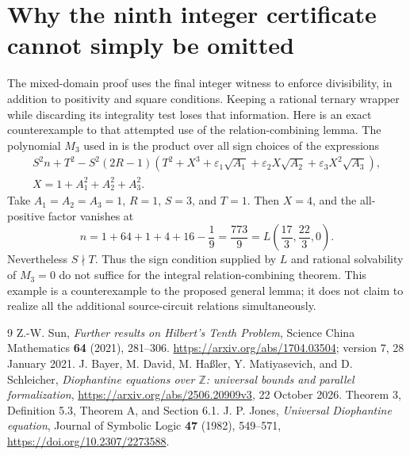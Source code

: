 \documentclass[11pt,a4paper]{article}
\begin{document}
\section{Why the ninth integer certificate cannot simply be omitted}
The mixed-domain proof uses the final integer witness to enforce divisibility,
in addition to positivity and square conditions. Keeping a rational ternary
wrapper while discarding its integrality test loses that information.
Here is an exact counterexample to that attempted use of the relation-combining
lemma. The polynomial $M_3$ used in \cite{Sun,BDHMS} is the product over all
sign choices of the expressions
\[
 \begin{gathered}
 S^2n+T^2-S^2(2R-1)
 \left(T^2+X^3+\varepsilon_1\sqrt{A_1}
       +\varepsilon_2X\sqrt{A_2}+\varepsilon_3X^2\sqrt{A_3}\right),
 \\
 X=1+A_1^2+A_2^2+A_3^2.
 \end{gathered}
\]
Take $A_1=A_2=A_3=1$, $R=1$, $S=3$, and $T=1$. Then $X=4$,
and the all-positive factor vanishes at
\[
 n=1+64+1+4+16-\frac19=\frac{773}{9}
   =L\left(\frac{17}{3},\frac{22}{3},0\right).
\]
Nevertheless $S\nmid T$. Thus the sign condition supplied by $L$ and
rational solvability of $M_3=0$ do not suffice for the integral
relation-combining theorem. This example is a counterexample to the proposed
general lemma; it does not claim to realize all the additional source-circuit
relations simultaneously.

\begin{thebibliography}{9}
 Z.-W. Sun, \emph{Further results on Hilbert's Tenth Problem},
Science China Mathematics \textbf{64} (2021), 281--306.
\url{https://arxiv.org/abs/1704.03504}; version 7, 28 January 2021.
 J. Bayer, M. David, M. Ha\ss ler, Y. Matiyasevich, and D. Schleicher,
\emph{Diophantine equations over $\mathbb Z$: universal bounds and parallel formalization},
\url{https://arxiv.org/abs/2506.20909v3}, 22 October 2026.
Theorem 3, Definition 5.3, Theorem A, and Section 6.1.
 J. P. Jones, \emph{Universal Diophantine equation},
Journal of Symbolic Logic \textbf{47} (1982), 549--571,
\url{https://doi.org/10.2307/2273588}.
\end{thebibliography}
\end{document}
